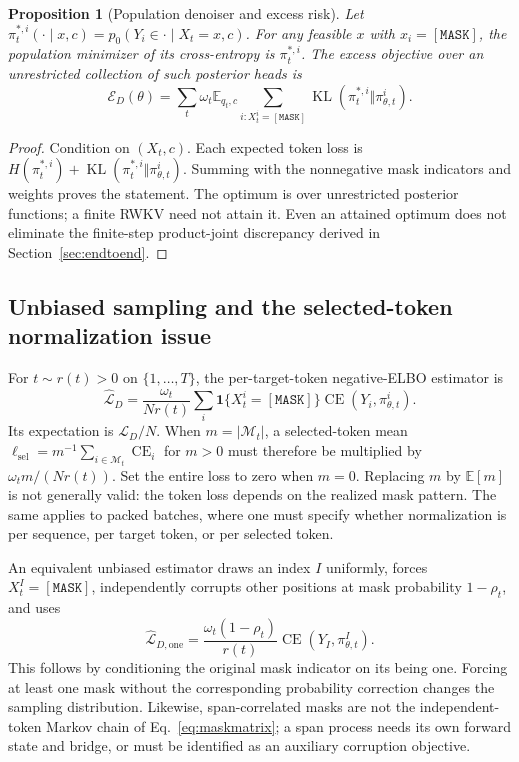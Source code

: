 \documentclass{article}
\newtheorem{proposition}[theorem]{Proposition}
\theoremstyle{remark}\newtheorem{remark}[theorem]{Remark}
\newcommand{\E}{\mathbb E}
\newcommand{\KL}{\operatorname{KL}}
\newcommand{\mask}{\mathtt{[MASK]}}
\begin{document}
\begin{proposition}[Population denoiser and excess risk]
\label{prop:maskrisk}
Let $\pi_t^{*,i}(\cdot\mid x,c)=p_0(Y_i\in\cdot\mid X_t=x,c)$. For any feasible $x$ with $x_i=\mask$, the population minimizer of its cross-entropy is $\pi_t^{*,i}$. The excess objective over an unrestricted collection of such posterior heads is
\begin{equation}
 \mathcal E_D(\theta)=\sum_t\omega_t\E_{q_t,c}
 \sum_{i:X_t^i=\mask}\KL(\pi_t^{*,i}\Vert\pi_{\theta,t}^i).
 \label{eq:maskexcess}
\end{equation}
\end{proposition}
\begin{proof}
Condition on $(X_t,c)$. Each expected token loss is
$H(\pi_t^{*,i})+\KL(\pi_t^{*,i}\Vert\pi_{\theta,t}^i)$. Summing with the nonnegative mask indicators and weights proves the statement. The optimum is over unrestricted posterior functions; a finite RWKV need not attain it. Even an attained optimum does not eliminate the finite-step product-joint discrepancy derived in Section~\ref{sec:endtoend}.
\end{proof}

\subsection{Unbiased sampling and the selected-token normalization issue}
For $t\sim r(t)>0$ on $\{1,\ldots,T\}$, the per-target-token negative-ELBO estimator is
\begin{equation}
 \widehat{\mathcal L}_D=\frac{\omega_t}{Nr(t)}
 \sum_i\mathbf1\{X_t^i=\mask\}\operatorname{CE}(Y_i,\pi_{\theta,t}^i).
 \label{eq:maskestimator}
\end{equation}
Its expectation is $\mathcal L_D/N$. When $m=|\mathcal M_t|$, a selected-token mean
$\ell_{\mathrm{sel}}=m^{-1}\sum_{i\in\mathcal M_t}\operatorname{CE}_i$ for $m>0$ must therefore be multiplied by $\omega_tm/(Nr(t))$. Set the entire loss to zero when $m=0$. Replacing $m$ by $\E[m]$ is not generally valid: the token loss depends on the realized mask pattern. The same applies to packed batches, where one must specify whether normalization is per sequence, per target token, or per selected token.

An equivalent unbiased estimator draws an index $I$ uniformly, forces $X_t^I=\mask$, independently corrupts other positions at mask probability $1-\rho_t$, and uses
\begin{equation}
 \widehat{\mathcal L}_{D,\mathrm{one}}
 =\frac{\omega_t(1-\rho_t)}{r(t)}\operatorname{CE}(Y_I,\pi_{\theta,t}^I).
 \label{eq:forcedmask}
\end{equation}
This follows by conditioning the original mask indicator on its being one. Forcing at least one mask without the corresponding probability correction changes the sampling distribution. Likewise, span-correlated masks are not the independent-token Markov chain of Eq.~\eqref{eq:maskmatrix}; a span process needs its own forward state and bridge, or must be identified as an auxiliary corruption objective.
\end{document}

